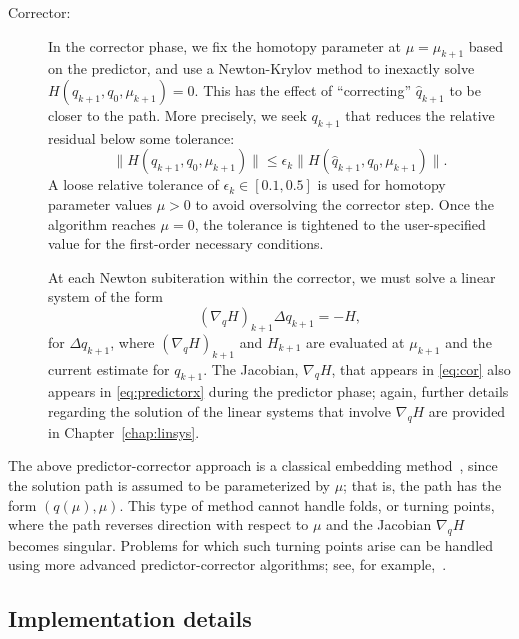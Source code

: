 \begin{description}
  \item[Corrector:] In the corrector phase, we fix the homotopy parameter
    at $\mu=\mu_{k+1}$ based on the predictor, and use a Newton-Krylov method to
    inexactly solve $H(q_{k+1},q_0,\mu_{k+1}) = 0$.  This has the effect of
    ``correcting'' $\hat{q}_{k+1}$ to be closer to the path.  More precisely,
    we seek $q_{k+1}$ that reduces the relative residual below some tolerance:
    \begin{equation}\label{eq:cornt}
      \lVert H(q_{k+1},q_0,\mu_{k+1}) \rVert \leq
      \epsilon_k \lVert H(\hat{q}_{k+1},q_0,\mu_{k+1}) \rVert.
    \end{equation}
    A loose relative tolerance of $\epsilon_k \in [0.1,0.5]$ is used for
    homotopy parameter values $\mu > 0$ to avoid oversolving the corrector step.
    Once the algorithm reaches $\mu = 0$, the tolerance is tightened to the
    user-specified value for the first-order necessary conditions.
    
    At each Newton subiteration within the corrector, we must solve a linear
    system of the form
    \begin{equation}\label{eq:cor}
      \left(\nabla_q H \right)_{k+1} \Delta q_{k+1} = -H,
    \end{equation}
    for $\Delta q_{k+1}$, where $(\nabla_q H)_{k+1}$ and $H_{k+1}$ are evaluated
    at $\mu_{k+1}$ and the current estimate for $q_{k+1}$.  The Jacobian,
    $\nabla_q H$, that appears in \eqref{eq:cor} also appears in
    \eqref{eq:predictorx} during the predictor phase; again, further details
    regarding the solution of the linear systems that involve $\nabla_q H$ are
    provided in Chapter~\ref{chap:linsys}.

\end{description}

\begin{remark}
  The above predictor-corrector approach is a classical embedding
  method~\cite{allgower_georg_1993}, since the solution path is assumed to be
  parameterized by $\mu$; that is, the path has the form $(q(\mu),\mu)$.  This
  type of method cannot handle folds, or turning points, where the path reverses
  direction with respect to $\mu$ and the Jacobian $\nabla_q H$ becomes
  singular.  Problems for which such turning points arise can be handled using
  more advanced predictor-corrector algorithms; see, for
  example,~\cite{walker:1999}.
\end{remark}

\subsection{Implementation details}

